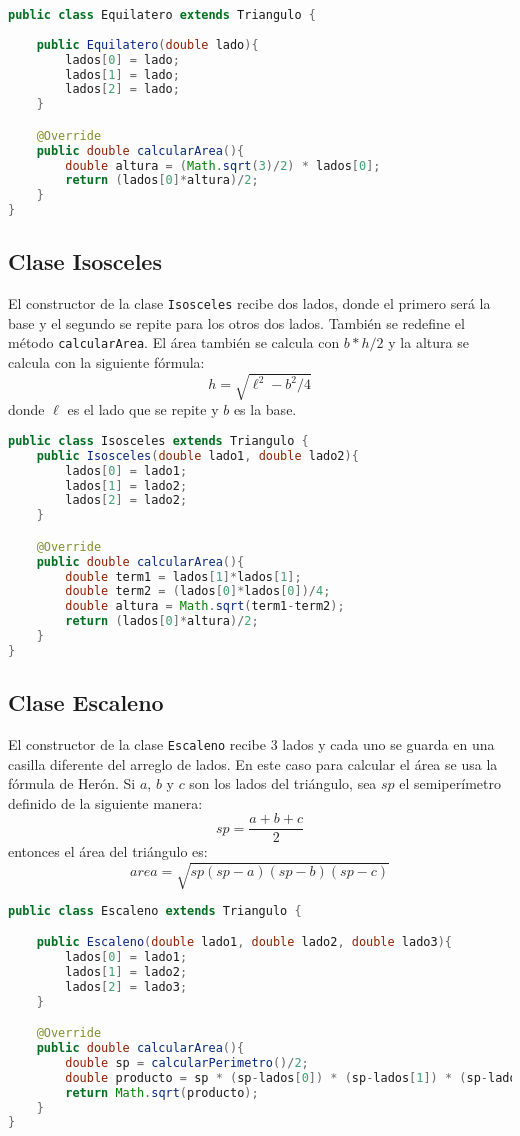 \documentclass{article}
\begin{document}
\begin{lstlisting}[language=Java]
public class Equilatero extends Triangulo {
    
    public Equilatero(double lado){
        lados[0] = lado;
        lados[1] = lado;
        lados[2] = lado;
    }

    @Override
    public double calcularArea(){
        double altura = (Math.sqrt(3)/2) * lados[0];
        return (lados[0]*altura)/2;
    }
}
\end{lstlisting}

\subsection{Clase Isosceles}

El constructor de la clase \texttt{Isosceles} recibe dos lados, donde el primero será la base y el segundo se repite para los otros dos lados. También se redefine el método \texttt{calcularArea}. El área también se calcula con $b*h/2$ y la altura se calcula con la siguiente fórmula:\[h = \sqrt{\ell^2 - b^2/4}\] donde $\ell$ es el lado que se repite y $b$ es la base.

\begin{lstlisting}[language=Java]
public class Isosceles extends Triangulo {
    public Isosceles(double lado1, double lado2){
        lados[0] = lado1;
        lados[1] = lado2;
        lados[2] = lado2;
    }

    @Override
    public double calcularArea(){
        double term1 = lados[1]*lados[1];
        double term2 = (lados[0]*lados[0])/4;
        double altura = Math.sqrt(term1-term2);
        return (lados[0]*altura)/2;
    }
}
\end{lstlisting}

\subsection{Clase Escaleno}

El constructor de la clase \texttt{Escaleno} recibe 3 lados y cada uno se guarda en una casilla diferente del arreglo de lados. En este caso para calcular el área se usa la fórmula de Herón. Si $a$, $b$ y $c$ son los lados del triángulo, sea $sp$ el semiperímetro definido de la siguiente manera: \[sp = \frac{a+b+c}{2}\] entonces el área del triángulo es: \[area = \sqrt{sp(sp-a)(sp-b)(sp-c)}\]

\begin{lstlisting}[language=Java]
public class Escaleno extends Triangulo {

    public Escaleno(double lado1, double lado2, double lado3){
        lados[0] = lado1;
        lados[1] = lado2;
        lados[2] = lado3;
    }

    @Override
    public double calcularArea(){
        double sp = calcularPerimetro()/2;
        double producto = sp * (sp-lados[0]) * (sp-lados[1]) * (sp-lados[2]);
        return Math.sqrt(producto);
    }
}
\end{lstlisting}
\end{document}
